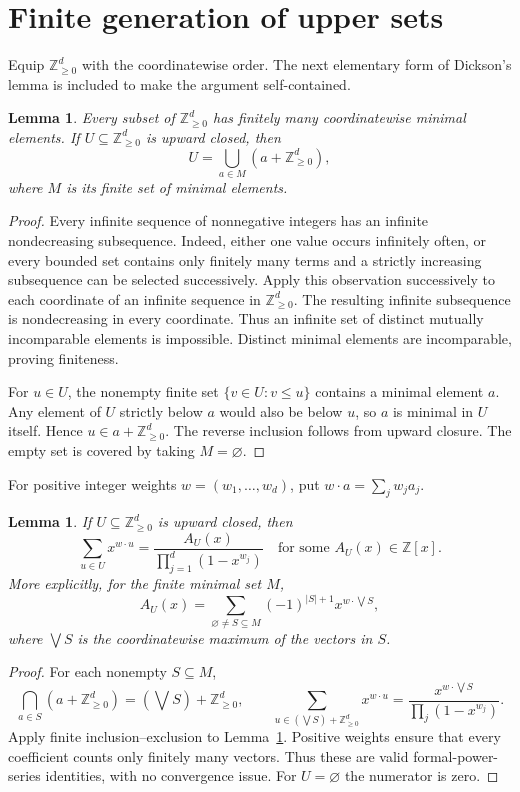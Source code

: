 \documentclass[11pt]{article}
\newtheorem{lemma}[theorem]{Lemma}
\newcommand{\NN}{\mathbb Z_{\geq0}}
\begin{document}
\section{Finite generation of upper sets}
Equip $\NN^d$ with the coordinatewise order. The next elementary form
of Dickson's lemma is included to make the argument self-contained.
\begin{lemma}\label{lem:dickson}
Every subset of $\NN^d$ has finitely many coordinatewise minimal
elements. If $U\subseteq\NN^d$ is upward closed, then
\[
 U=\bigcup_{a\in M}(a+\NN^d),
\]
where $M$ is its finite set of minimal elements.
\end{lemma}
\begin{proof}
Every infinite sequence of nonnegative integers has an infinite
nondecreasing subsequence. Indeed, either one value occurs infinitely
often, or every bounded set contains only finitely many terms and a
strictly increasing subsequence can be selected successively.
Apply this observation successively to each coordinate of an infinite
sequence in $\NN^d$. The resulting infinite subsequence is nondecreasing
in every coordinate. Thus an infinite set of distinct mutually
incomparable elements is impossible. Distinct minimal elements are
incomparable, proving finiteness.

For $u\in U$, the nonempty finite set
$\{v\in U:v\leq u\}$ contains a minimal element $a$. Any element of
$U$ strictly below $a$ would also be below $u$, so $a$ is minimal in
$U$ itself. Hence $u\in a+\NN^d$. The reverse inclusion follows
from upward closure. The empty set is covered by taking $M=\varnothing$.
\end{proof}

For positive integer weights $w=(w_1,\ldots,w_d)$, put
$w\cdot a=\sum_jw_ja_j$.
\begin{lemma}\label{lem:series}
If $U\subseteq\NN^d$ is upward closed, then
\[
 \sum_{u\in U}x^{w\cdot u}
 =\frac{A_U(x)}{\prod_{j=1}^d(1-x^{w_j})}
 \quad\text{for some }A_U(x)\in\mathbb Z[x].
\]
More explicitly, for the finite minimal set $M$,
\begin{equation}\label{eq:ie}
 A_U(x)=\sum_{\varnothing\ne S\subseteq M}
 (-1)^{|S|+1}x^{w\cdot\bigvee S},
\end{equation}
where $\bigvee S$ is the coordinatewise maximum of the vectors in $S$.
\end{lemma}
\begin{proof}
For each nonempty $S\subseteq M$,
\[
 \bigcap_{a\in S}(a+\NN^d)=(\bigvee S)+\NN^d,
 \qquad
 \sum_{u\in(\bigvee S)+\NN^d}x^{w\cdot u}
 =\frac{x^{w\cdot\bigvee S}}{\prod_j(1-x^{w_j})}.
\]
Apply finite inclusion--exclusion to Lemma~\ref{lem:dickson}.
Positive weights ensure that every coefficient counts only finitely
many vectors. Thus these are valid formal-power-series identities,
with no convergence issue. For $U=\varnothing$ the numerator is zero.
\end{proof}
\end{document}
